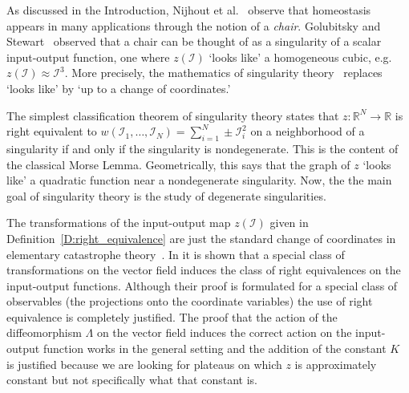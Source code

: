 \documentclass[a4paper,fleqn]{cas-dc}
\newcommand{\R}{\mathbb{R}}
\newcommand{\II}{{\mathcal I}}
\newcommand{\END}{\hfill\mbox{\raggedright \mbox{\raisebox{2pt}{\scalebox{0.6}{$\Diamond$}}}}\medskip}
\newcommand{\etal}{\textrm{et al.}}
\begin{document}
As discussed in the Introduction, Nijhout \etal~\cite{nbr2014} observe that homeostasis appears in many applications through the notion of a {\em chair}.  
Golubitsky and Stewart~\cite{gs2018}
observed that a chair can be thought of as a singularity of a scalar input-output function, one where $z(\II)$ `looks like' a homogeneous cubic, e.g. $z(\II) \approx \II^3$.  
More precisely, the mathematics of singularity theory~\cite{poston-stewart1978,golubitsky1978} replaces `looks like' by `up to a change of coordinates.'



The simplest classification theorem of singularity theory states that $z:\R^N\to\R$ is right equivalent to $w(\II_1,\ldots,\II_N) = \sum_{i=1}^N\pm\II_i^2$ on a neighborhood of a singularity if and only if the singularity is nondegenerate.
This is the content of the classical Morse Lemma.
Geometrically, this says that the graph of $z$ `looks like' a quadratic function near a nondegenerate singularity.
Now, the the main goal of singularity theory is the study of degenerate singularities.

The transformations of the input-output map $z(\II)$ given in Definition~\ref{D:right_equivalence} are just the standard change of coordinates in elementary catastrophe theory~\cite{golubitsky1978, poston-stewart1978, zeeman1977}.
In \cite{gs2017,gs2018} it is shown that a special class of transformations on the vector field induces the class of right equivalences on the input-output functions.
Although their proof is formulated for a special class of observables (the projections onto the coordinate variables) the use of right equivalence is completely justified.
The proof that the action of the diffeomorphism $\Lambda$ on the vector field induces the correct action on the input-output function works in the general setting and the addition of the constant $K$ is justified because we are looking for plateaus on which $z$ is approximately constant but not specifically what that constant is.
\end{document}
